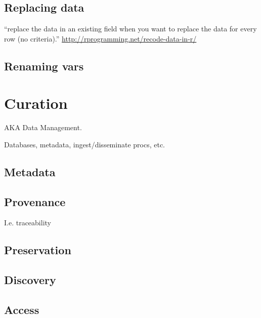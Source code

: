 \documentclass[reqno,12pt]{tufte-book}
\numberwithin{equation}{subsection}
\begin{document}
\section{Replacing data}
\label{sect:datareplacement}

``replace the data in an existing field when you want to replace the data for every row (no criteria).'' \url{http://rprogramming.net/recode-data-in-r/}

\section{Renaming vars}
\label{sect:renamingvars}

\chapter{Curation}

AKA Data Management.

Databases, metadata, ingest/disseminate procs, etc.

\section{Metadata}
\label{sect:datameta}

\section{Provenance}
\label{sect:dataprovenance}

I.e. traceability

\section{Preservation}
\label{sect:datapreservation}

\section{Discovery}
\label{sect:discovery}

\section{Access}
\label{sect:access}
\end{document}
